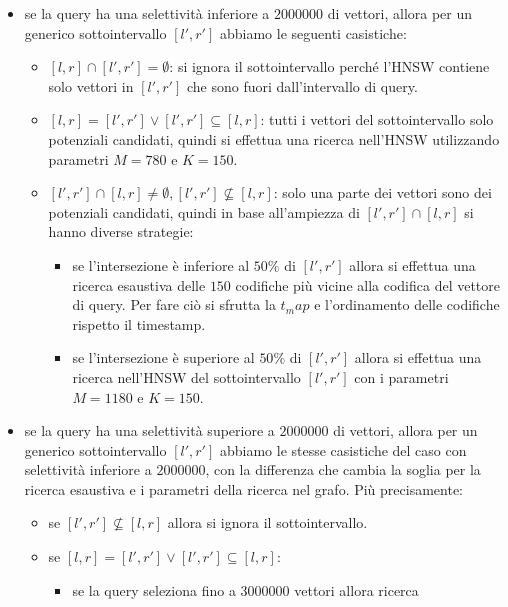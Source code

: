 \begin{itemize}
    \item se la query ha una selettività inferiore a $2000000$ di vettori, allora 
    per un generico sottointervallo $[l',r']$ abbiamo le seguenti casistiche:
    \begin{itemize}
        \item $[l,r]\cap [l',r'] = \emptyset$: si ignora il sottointervallo perché 
        l'HNSW contiene solo vettori in $[l',r']$ che sono fuori dall'intervallo 
        di query.
        \item $[l,r] = [l',r'] \lor  [l',r'] \subseteq [l,r]$: tutti i vettori 
        del sottointervallo solo potenziali candidati, quindi si effettua una ricerca nell'HNSW
        utilizzando parametri $M=780$ e $K=150$.
        \item $[l',r'] \cap [l,r] \ne \emptyset, [l',r'] \not \subseteq [l,r]$: 
        solo una parte dei vettori sono dei potenziali candidati, quindi in base 
        all'ampiezza di $[l',r'] \cap [l,r]$ si hanno diverse strategie:
        \begin{itemize}
            \item se l'intersezione è inferiore al $50\%$ di $[l',r']$ allora si effettua una 
            ricerca esaustiva delle $150$ codifiche più vicine alla codifica del 
            vettore di query. Per fare ciò si sfrutta la $t_map$ e 
            l'ordinamento delle codifiche rispetto il timestamp.
            \item se l'intersezione è superiore al $50\%$ di $[l',r']$ allora si effettua una 
            ricerca nell'HNSW del sottointervallo $[l',r']$ con i parametri $M=1180$ e $K=150$.
        \end{itemize}
    \end{itemize}
    \item se la query ha una selettività superiore a $2000000$ di vettori, allora 
    per un generico sottointervallo $[l',r']$ abbiamo le stesse casistiche 
    del caso con selettività inferiore a $2000000$, con la differenza che cambia
    la soglia per la ricerca esaustiva e i parametri della ricerca nel grafo. Più 
    precisamente:
    \begin{itemize}
        \item se $[l',r'] \not \subseteq [l,r]$ allora si ignora il sottointervallo.
        \item se $[l,r] = [l',r'] \lor  [l',r'] \subseteq [l,r]$:
        \begin{itemize}
            \item se la query seleziona fino a $3000000$ vettori allora ricerca 

\end{itemize}
\end{itemize}
\end{itemize}
